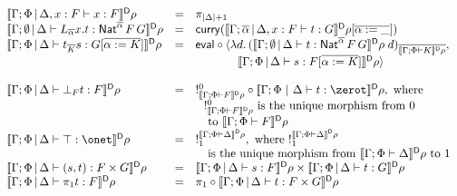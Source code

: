 \documentclass[runningheads]{llncs}
\begin{document}
\begin{figure}[t]
\begin{adjustbox}{varwidth=6in, max width=5.3in, fbox, center}
\[\begin{array}{lll}
\dsem{\Gamma;\Phi \,|\, \Delta,x :F \vdash x : F} \rho& = &
\pi_{|\Delta|+1}\\
\dsem{\Gamma;\emptyset \,|\, \Delta \vdash L_{\overline \alpha} x.t : \Nat^{\overline
    \alpha} \,F \,G}\rho & = &  \curry (\dsem{\Gamma;\overline \alpha
  \,|\, \Delta, x : F \vdash t: G}\rho[\overline{\alpha := \_}])\\
\dsem{\Gamma;\Phi \,|\, \Delta \vdash t_{\overline K} s:
  G [\overline{\alpha := K}]}\rho & = & \eval \circ \langle
  \lambda d.\,(\dsem{\Gamma;\emptyset \,|\, \Delta \vdash t :
  \Nat^{\overline{\alpha}} \,F \,G}\rho\; d)_{\overline{\dsem{\Gamma;\Phi
      \vdash K}\rho}},\\ 
 & & \hspace*{0.5in} \dsem{\Gamma;\Phi \,|\,
    \Delta \vdash s: F [\overline{\alpha := K}]}\rho \rangle\\ 
& & \\
\dsem{\Gamma;\Phi \,|\, \Delta \vdash \bot_F t : F} \rho& = &
!^0_{\dsem{\Gamma;\Phi \vdash F}\rho} \circ
  \dsem{\Gamma;\Phi~|~\Delta \vdash t : \zerot}\rho, \mbox{ where } \\
 & & \hspace*{0.1in} !^0_{\dsem{\Gamma;\Phi \vdash F}\rho}
\mbox{ is the unique morphism from } 0\\
 & & \hspace*{0.1in} \mbox{ to } \dsem{\Gamma;\Phi \vdash F}\rho\\
\dsem{\Gamma;\Phi \,|\, \Delta \vdash \top : \onet}\rho & = &
!^{\dsem{\Gamma;\Phi\vdash \Delta}\rho}_1, \mbox{ where }
!^{\dsem{\Gamma;\Phi\vdash \Delta}\rho}_1\\ 
& & \hspace*{0.1in} \mbox{ is the unique morphism from }
\dsem{\Gamma;\Phi\vdash \Delta}\rho \mbox{ to } 1\\ 
\dsem{\Gamma;\Phi \,|\, \Delta \vdash (s,t) : F \times G} \rho& = &
\dsem{\Gamma;\Phi \,|\, \Delta \vdash s: F} \rho\times
\dsem{\Gamma;\Phi \,|\, \Delta \vdash t : G} \rho\\
\dsem{\Gamma;\Phi \,|\, \Delta \vdash \pi_1 t : F} \rho& = &
\pi_1 \circ \dsem{\Gamma;\Phi \,|\, \Delta \vdash t : F \times G}\rho\\

\end{array}\]
\end{adjustbox}
\end{figure}
\end{document}
